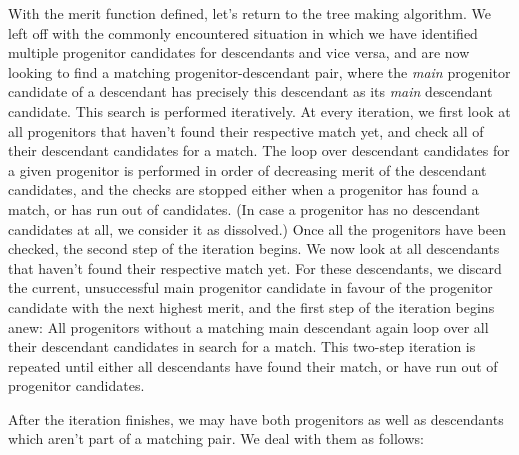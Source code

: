 With the merit function defined, let's return to the tree making algorithm. We left off with the commonly encountered situation in which we have identified multiple progenitor candidates for descendants and vice versa, and are now
looking to find a matching progenitor-descendant pair, where the \textit{main} progenitor candidate of a descendant has precisely this descendant as its \textit{main} descendant candidate. This search is performed iteratively.
At every iteration, we first look at all progenitors that haven't found their respective match yet, and check all of their descendant candidates for a match. The loop over descendant candidates for a given progenitor is performed in order of decreasing merit of the descendant candidates, and the checks are  stopped either when a progenitor has found a match, or has run out of candidates. (In case a progenitor has no descendant candidates at all, we consider it as dissolved.)
Once all the progenitors have been checked, the second step of the iteration begins. We now look at all descendants that haven't found their respective match yet. For these descendants, we discard the current, unsuccessful main progenitor candidate in favour of the progenitor candidate with the next highest merit, and the first step of the iteration begins anew: All progenitors without a matching main descendant again loop over all their descendant candidates in search for a match. This two-step iteration is repeated until either all descendants have found their match, or have run out of progenitor candidates.

After the iteration finishes, we may have both progenitors as well as descendants which aren't part of a matching pair. We deal with them as follows:

